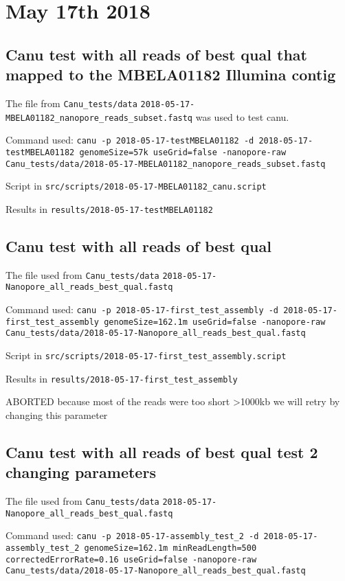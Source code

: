 \documentclass[10pt,a4paper]{article}
\begin{document}
\section{May 17th 2018}

\subsection{Canu test with all reads of best qual that mapped to the MBELA01182 Illumina contig}
The file from \verb!Canu_tests/data!
 \verb!2018-05-17-MBELA01182_nanopore_reads_subset.fastq! was used to test canu.

Command used:
 \verb!canu -p 2018-05-17-testMBELA01182 -d 2018-05-17-testMBELA01182 genomeSize=57k useGrid=false -nanopore-raw Canu_tests/data/2018-05-17-MBELA01182_nanopore_reads_subset.fastq!

Script in  \verb!src/scripts/2018-05-17-MBELA01182_canu.script!

Results in \texttt{results/2018-05-17-testMBELA01182}

\subsection{Canu test with all reads of best qual}
The file used from  \verb!Canu_tests/data!
 \verb!2018-05-17-Nanopore_all_reads_best_qual.fastq!

Command used:
 \verb!canu -p 2018-05-17-first_test_assembly -d 2018-05-17-first_test_assembly genomeSize=162.1m useGrid=false -nanopore-raw Canu_tests/data/2018-05-17-Nanopore_all_reads_best_qual.fastq!

Script in  \verb!src/scripts/2018-05-17-first_test_assembly.script!

Results in  \verb!results/2018-05-17-first_test_assembly!

ABORTED because most of the reads were too short >1000kb we will retry by changing this parameter

\subsection{Canu test with all reads of best qual test 2 changing parameters}
The file used from  \verb!Canu_tests/data!
  \verb!2018-05-17-Nanopore_all_reads_best_qual.fastq!

Command used:
 \verb!canu -p 2018-05-17-assembly_test_2 -d 2018-05-17-assembly_test_2 genomeSize=162.1m minReadLength=500 correctedErrorRate=0.16 useGrid=false -nanopore-raw Canu_tests/data/2018-05-17-Nanopore_all_reads_best_qual.fastq!
\end{document}
